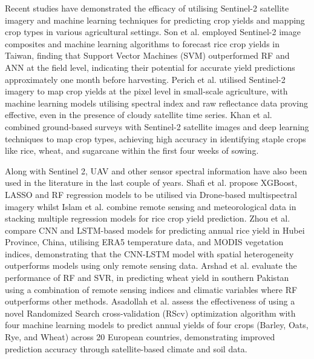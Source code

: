 Recent studies have demonstrated the efficacy of utilising Sentinel-2 satellite imagery and machine learning techniques for predicting crop yields and mapping crop types in various agricultural settings. Son et al. \cite{son2022field} employed Sentinel-2 image composites and machine learning algorithms to forecast rice crop yields in Taiwan, finding that Support Vector Machines (SVM) outperformed RF and ANN at the field level, indicating their potential for accurate yield predictions approximately one month before harvesting. Perich et al. \cite{perich2023pixel} utilised Sentinel-2 imagery to map crop yields at the pixel level in small-scale agriculture, with machine learning models utilising spectral index and raw reflectance data proving effective, even in the presence of cloudy satellite time series. Khan et al. \cite{khan2023early} combined ground-based surveys with Sentinel-2 satellite images and deep learning techniques to map crop types, achieving high accuracy in identifying staple crops like rice, wheat, and sugarcane within the first four weeks of sowing. 

Along with Sentinel 2, UAV and other sensor spectral information have also been used in the literature in the last couple of years. Shafi et al. \cite{shafi2023tackling} propose XGBoost, LASSO and RF regression models to be utilised via Drone-based multispectral imagery whilst Islam et al. \cite{islam2023rapid} combine remote sensing and meteorological data in stacking multiple regression models for rice crop yield prediction. Zhou et al. \cite{zhou2023rice} compare CNN and LSTM-based models for predicting annual rice yield in Hubei Province, China, utilising ERA5 temperature data, and MODIS vegetation indices, demonstrating that the CNN-LSTM model with spatial heterogeneity outperforms models using only remote sensing data. Arshad et al. \cite{arshad2023applicability} evaluate the performance of RF and SVR, in predicting wheat yield in southern Pakistan using a combination of remote sensing indices and climatic variables where RF outperforms other methods. Asadollah et al. \cite{asadollah2024optimizing} assess the effectiveness of using a novel Randomized Search cross-validation (RScv) optimization algorithm with four machine learning models to predict annual yields of four crops (Barley, Oats, Rye, and Wheat) across 20 European countries, demonstrating improved prediction accuracy through satellite-based climate and soil data. 

